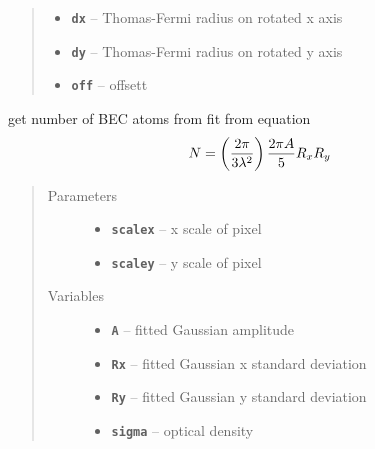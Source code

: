 \documentclass[letterpaper,10pt,english]{sphinxmanual}
\begin{document}
\begin{fulllineitems}
\begin{fulllineitems}
\begin{quote}
\begin{description}
\begin{itemize}
\item {} 
\textbf{\texttt{dx}} -- Thomas-Fermi radius on rotated x axis

\item {} 
\textbf{\texttt{dy}} -- Thomas-Fermi radius on rotated y axis

\item {} 
\textbf{\texttt{off}} -- offsett

\end{itemize}

\end{description}\end{quote}

\end{fulllineitems}


\begin{fulllineitems}
\label{fit_object:Fitobject.fit_object.Therm_num}
get number of BEC atoms from fit from equation
\begin{gather}
\begin{split}N = \left(\frac{2 \pi}{3\lambda^2}\right)\frac{2\pi A}{5}R_x R_y\end{split}\notag
\end{gather}\begin{quote}\begin{description}
\item[{Parameters}] \leavevmode\begin{itemize}
\item {} 
\textbf{\texttt{scalex}} -- x scale of pixel

\item {} 
\textbf{\texttt{scaley}} -- y scale of pixel

\end{itemize}

\item[{Variables}] \leavevmode\begin{itemize}
\item {} 
\textbf{\texttt{A}} -- fitted Gaussian amplitude

\item {} 
\textbf{\texttt{Rx}} -- fitted Gaussian x standard deviation

\item {} 
\textbf{\texttt{Ry}} -- fitted Gaussian y standard deviation

\item {} 
\textbf{\texttt{sigma}} -- optical density


\end{itemize}
\end{description}
\end{quote}
\end{fulllineitems}
\end{fulllineitems}
\end{document}
